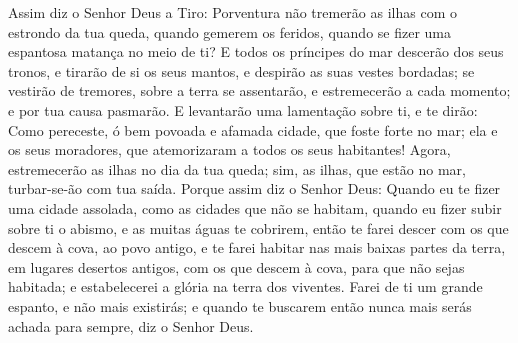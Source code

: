 Assim diz o Senhor Deus a Tiro: Porventura não tremerão as ilhas
com o estrondo da tua queda, quando gemerem os feridos, quando se
fizer uma espantosa matança no meio de ti? E todos os
príncipes do mar descerão dos seus tronos, e tirarão de si os seus
mantos, e despirão as suas vestes bordadas; se vestirão de tremores,
sobre a terra se assentarão, e estremecerão a cada momento; e por
tua causa pasmarão. E levantarão uma lamentação sobre ti, e
te dirão: Como pereceste, ó bem povoada e afamada cidade, que foste
forte no mar; ela e os seus moradores, que atemorizaram a todos os
seus habitantes! Agora, estremecerão as ilhas no dia da tua
queda; sim, as ilhas, que estão no mar, turbar-se-ão com tua saída.
Porque assim diz o Senhor Deus: Quando eu te fizer uma cidade
assolada, como as cidades que não se habitam, quando eu fizer subir
sobre ti o abismo, e as muitas águas te cobrirem, então te
farei descer com os que descem à cova, ao povo antigo, e te farei
habitar nas mais baixas partes da terra, em lugares desertos
antigos, com os que descem à cova, para que não sejas habitada; e
estabelecerei a glória na terra dos viventes. Farei de ti um
grande espanto, e não mais existirás; e quando te buscarem então
nunca mais serás achada para sempre, diz o Senhor Deus.

\medskip

